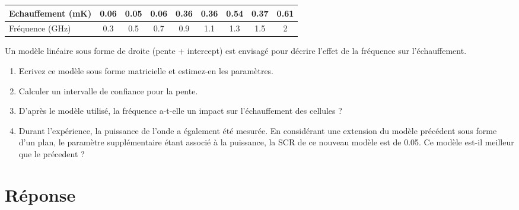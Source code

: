 \documentclass[a4paper, 12pt]{article}
\begin{document}
  \begin{tabular}{lcccccccc}
   Echauffement (mK) & 0.06 & 0.05 & 0.06 & 0.36 & 0.36 & 0.54 & 0.37 & 0.61 \\
   \hline
   Fréquence (GHz) & 0.3 & 0.5 & 0.7 & 0.9 & 1.1 & 1.3 & 1.5 & 2 \\
  \end{tabular} \bigskip
  
  Un modèle linéaire sous forme de droite (pente + intercept) est envisagé pour décrire l'effet de la fréquence sur l'échauffement. \bigskip
  
  \begin{enumerate}
   \item Ecrivez ce modèle sous forme matricielle et estimez-en les paramètres.
   \item Calculer un intervalle de confiance pour la pente.
   \item D'après le modèle utilisé, la fréquence a-t-elle un impact sur l'échauffement des cellules ?
   \item Durant l'expérience, la puissance de l'onde a également été mesurée. En considérant une extension du modèle précédent sous forme d'un plan, le paramètre supplémentaire étant associé à la puissance, la SCR de ce nouveau modèle est de 0.05. Ce modèle est-il meilleur que le précedent ?
  \end{enumerate}
  
  \color{red!70}
  \section*{Réponse}
\end{document}
